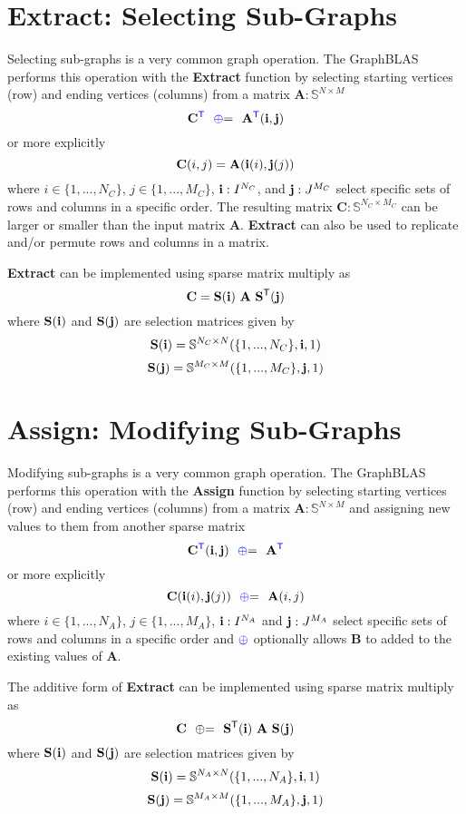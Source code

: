 \section{Extract: Selecting Sub-Graphs}
  Selecting sub-graphs is a very common graph operation.  The GraphBLAS performs this operation with the {\bf Extract} function by selecting starting vertices (row) and ending vertices (columns) from a matrix $\mathbf{A} : \mathbb{S}^{N \times M}$
$$
   \mathbf{C}^{\textcolor{blue}{\sf T}} ~~ {\textcolor{blue}{\oplus}}{=} ~~  \mathbf{A}^{\textcolor{blue}{\sf T}}({\bf i},{\bf j})
$$
or more explicitly
$$
   {\bf C}(i,j) = {\bf A}({\bf i}(i),{\bf j}(j))
$$
where $i \in \{1,...,N_C\}$, $j \in \{1,...,M_C\}$, ${\bf i} : I^{N_C}$, and ${\bf j}: J^{M_C}$  select specific sets of rows and columns in a specific order.   The resulting matrix $\mathbf{C} : \mathbb{S}^{N_C \times M_C}$ can be larger or smaller than the input matrix $\mathbf{A}$.  {\bf Extract} can also be used to replicate and/or permute rows and columns in a matrix.

  {\bf Extract} can be implemented using sparse matrix multiply as
$$
   \mathbf{C}= \mathbf{S}({\bf i}) ~ \mathbf{A} ~ \mathbf{S}^{\sf T}({\bf j})
$$
where $\mathbf{S}({\bf i})$ and $\mathbf{S}({\bf j})$ are selection matrices given by
$$
   \mathbf{S}({\bf i}) = \mathbb{S}^{N_C \times N}(\{1,...,N_C\},{\bf i},1)
$$
$$
    \mathbf{S}({\bf j}) = \mathbb{S}^{M_C \times M}(\{1,...,M_C\},{\bf j},1)
$$


\section{Assign: Modifying Sub-Graphs}
  Modifying sub-graphs is a very common graph operation.  The GraphBLAS performs this operation with the {\bf Assign} function by selecting starting vertices (row) and ending vertices (columns) from a matrix $\mathbf{A} : \mathbb{S}^{N \times M}$ and assigning new values to them from another sparse matrix
$$
   \mathbf{C}^{\textcolor{blue}{\sf T}}({\bf i},{\bf j}) ~~ {\textcolor{blue}{\oplus}}{=} ~~ \mathbf{A}^{\textcolor{blue}{\sf T}}
$$
or more explicitly
$$
   {\bf C}({\bf i}(i),{\bf j}(j)) ~~ {\textcolor{blue}{\oplus}}{=} ~~{\bf A}(i,j) 
$$
where $i \in \{1,...,N_A\}$, $j \in \{1,...,M_A\}$, ${\bf i} : I^{N_A}$ and ${\bf j}: J^{M_A}$ select specific sets of rows and columns in a specific order and ${\textcolor{blue}{\oplus}}$ optionally allows $\mathbf{B}$ to added to the existing values of $\mathbf{A}$. 

  The additive form of {\bf Extract} can be implemented using sparse matrix multiply as
$$
   \mathbf{C} ~~ {\oplus}{=} ~~ \mathbf{S}^{\sf T}({\bf i}) ~ \mathbf{A} ~ \mathbf{S}({\bf j})
$$
where $\mathbf{S}({\bf i})$ and $\mathbf{S}({\bf j})$ are selection matrices given by
$$
   \mathbf{S}({\bf i}) = \mathbb{S}^{N_A \times N}(\{1,...,N_A\},{\bf i},1)
$$
$$
    \mathbf{S}({\bf j}) = \mathbb{S}^{M_A \times M}(\{1,...,M_A\},{\bf j},1)
$$
  

